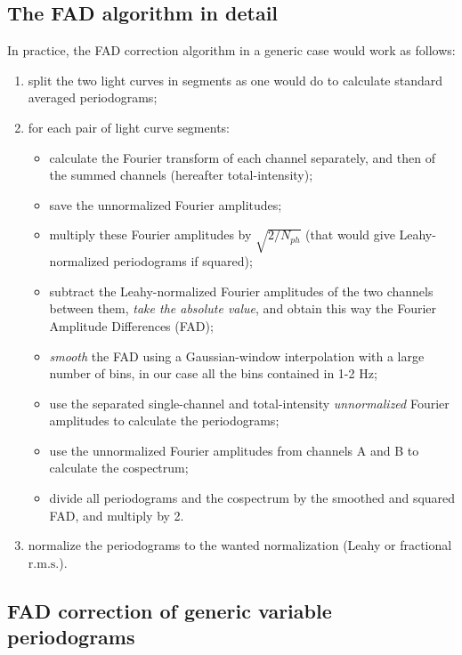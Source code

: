\documentclass[twocolumn]{aastex61}
\newcommand{\rms}{\ensuremath{\mathrm{r.m.s.}}\xspace}
\begin{document}

\subsection{The FAD algorithm in detail} \label{sec:fad}
In practice, the FAD correction algorithm in a generic case would work as follows:
\begin{enumerate}
\item split the two light curves in segments as one would do to calculate standard averaged periodograms;
\item for each pair of light curve segments: 
	\begin{itemize}
	\item calculate the Fourier transform of each channel separately, and then of the summed channels (hereafter total-intensity);
	\item save the unnormalized Fourier amplitudes;
	\item multiply these Fourier amplitudes by $\sqrt{2/N_{ph}}$ (that would give Leahy-normalized periodograms if squared);
	\item subtract the Leahy-normalized Fourier amplitudes of the two channels between them, \textit{take the absolute value}, and obtain this way the Fourier Amplitude Differences (FAD);
	\item \textit{smooth} the FAD using a Gaussian-window interpolation with a large number of bins, in our case all the bins contained in 1-2 Hz;
	\item use the separated single-channel and total-intensity \textit{unnormalized} Fourier amplitudes to calculate the periodograms;
	\item use the unnormalized Fourier amplitudes from channels A and B to calculate the cospectrum;
	\item divide all periodograms and the cospectrum by the smoothed and squared FAD, and multiply by 2.
	\end{itemize}
\item normalize the periodograms to the wanted normalization (Leahy or fractional \rms).
\end{enumerate}

\subsection{FAD correction of generic variable periodograms} \label{sec:correction}
\end{document}
